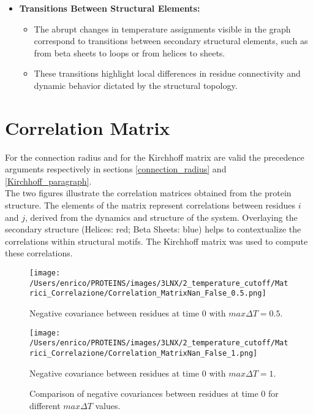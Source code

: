 \documentclass[English, Lau, oneside]{sapthesis}
\begin{document}
\begin{itemize}
    \item \textbf{Transitions Between Structural Elements:}
    \begin{itemize}
        \item The abrupt changes in temperature assignments visible in the graph correspond to transitions between secondary structural elements, such as from beta sheets to loops or from helices to sheets.
        \item These transitions highlight local differences in residue connectivity and dynamic behavior dictated by the structural topology.
    \end{itemize}
\end{itemize}

\newpage
\section{Correlation Matrix}
\noindent For the connection radius and for the Kirchhoff matrix are valid the precedence arguments respectively in sections \ref{connection_radius} and \ref{Kirchhoff_paragraph}.\\
The two figures illustrate the correlation matrices obtained from the protein structure. The elements of the matrix represent correlations between residues \(i\) and \(j\), derived from the dynamics and structure of the system. Overlaying the secondary structure (Helices: red; Beta Sheets: blue) helps to contextualize the correlations within structural motifs. The Kirchhoff matrix was used to compute these correlations.
\begin{figure}[h!]
    \centering
    \begin{minipage}{0.49\textwidth}
        \centering
        \texttt{[image: /Users/enrico/PROTEINS/images/3LNX/2\_temperature\_cutoff/Matrici\_Correlazione/Correlation\_MatrixNan\_False\_0.5.png]}
        \caption{Negative covariance between residues at time 0 with $max \Delta T = 0.5$.}
    \end{minipage}
    \hfill
    \begin{minipage}{0.49\textwidth}
        \centering
        \texttt{[image: /Users/enrico/PROTEINS/images/3LNX/2\_temperature\_cutoff/Matrici\_Correlazione/Correlation\_MatrixNan\_False\_1.png]}
        \caption{Negative covariance between residues at time 0 with $max \Delta T = 1$.}
    \end{minipage}
    \caption{Comparison of negative covariances between residues at time 0 for different $max \Delta T$ values.}
    \label{fig:correlation_comparison_out}

\end{figure}
\end{document}
